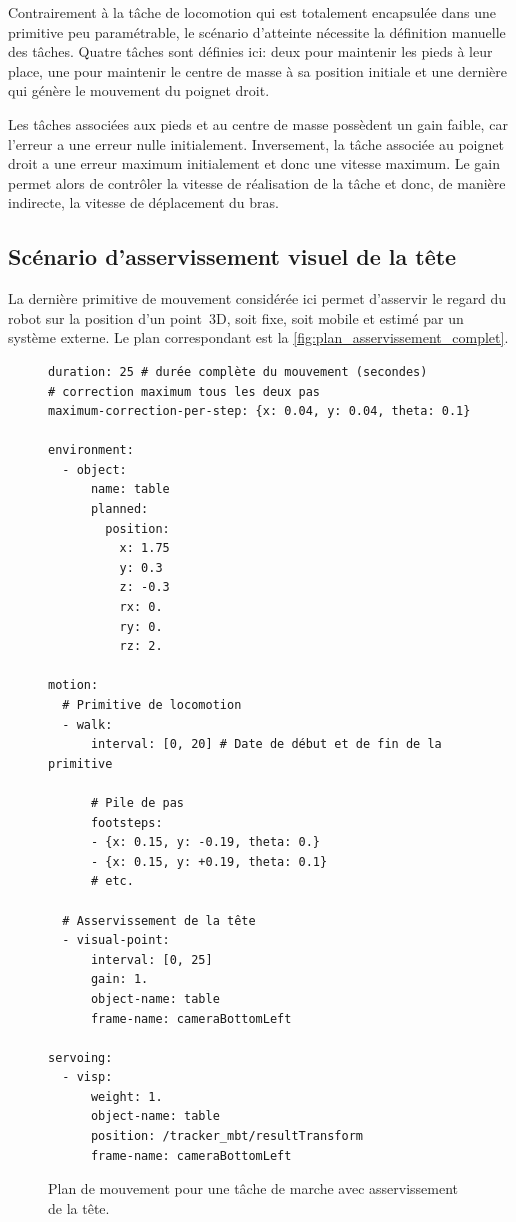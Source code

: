 Contrairement à la tâche de locomotion qui est totalement encapsulée
dans une primitive peu paramétrable, le scénario d'atteinte nécessite
la définition manuelle des tâches. Quatre tâches sont définies ici:
deux pour maintenir les pieds à leur place, une pour maintenir le
centre de masse à sa position initiale et une dernière qui génère le
mouvement du poignet droit.

Les tâches associées aux pieds et au centre de masse possèdent un gain
faible, car l'erreur a une erreur nulle initialement. Inversement, la
tâche associée au poignet droit a une erreur maximum initialement et
donc une vitesse maximum. Le gain permet alors de contrôler la vitesse
de réalisation de la tâche et donc, de manière indirecte, la vitesse
de déplacement du bras.

\FloatBarrier

\subsection{Scénario d'asservissement visuel de la tête}

La dernière primitive de mouvement considérée ici permet d'asservir le
regard du robot sur la position d'un point 3D, soit fixe, soit mobile
et estimé par un système externe. Le plan correspondant est la
\autoref{fig:plan_asservissement_complet}.

\begin{figure}
  \footnotesize
  \begin{center}
\begin{verbatim}
duration: 25 # durée complète du mouvement (secondes)
# correction maximum tous les deux pas
maximum-correction-per-step: {x: 0.04, y: 0.04, theta: 0.1}

environment:
  - object:
      name: table
      planned:
        position:
          x: 1.75
          y: 0.3
          z: -0.3
          rx: 0.
          ry: 0.
          rz: 2.

motion:
  # Primitive de locomotion
  - walk:
      interval: [0, 20] # Date de début et de fin de la primitive

      # Pile de pas
      footsteps:
      - {x: 0.15, y: -0.19, theta: 0.}
      - {x: 0.15, y: +0.19, theta: 0.1}
      # etc.

  # Asservissement de la tête
  - visual-point:
      interval: [0, 25]
      gain: 1.
      object-name: table
      frame-name: cameraBottomLeft

servoing:
  - visp:
      weight: 1.
      object-name: table
      position: /tracker_mbt/resultTransform
      frame-name: cameraBottomLeft
\end{verbatim}
  \end{center}
  \caption{Plan de mouvement pour une tâche de marche avec
    asservissement de la tête.\label{fig:plan_asservissement_complet}}
\end{figure}

